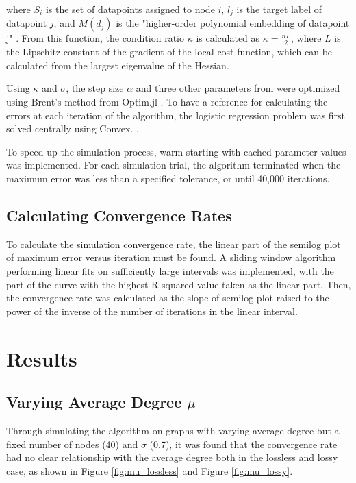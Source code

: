 \documentclass[conference]{IEEEtran}
\begin{document}
where $S_{i}$ is the set of datapoints assigned to node $i$, $l_{j}$ is the target label of datapoint $j$, and $M(d_{j})$ is the "higher-order polynomial embedding of datapoint j" \autocite{ridgleySelfHealingFirstOrderDistributed2021}.
From this function, the condition ratio $\kappa$ is calculated as $\kappa = \frac{nL}{2}$, where $L$ is the Lipschitz constant of the gradient of the local cost function, which can be calculated from the largest eigenvalue of the Hessian.

Using $\kappa$ and $\sigma$, the step size $\alpha$ and three other parameters from \autocite{sundararajanAnalysisDesignFirstOrder2020} were optimized using Brent's method from Optim.jl \autocite{Optim.jl-2018}. To have a reference for calculating the errors 
at each iteration of the algorithm, the logistic regression problem was first solved centrally using Convex. \autocite{Convex.jl-2014}. 

To speed up the simulation process, warm-starting with cached parameter values was implemented. For each simulation trial, the algorithm terminated when the maximum error was less than a specified tolerance, or until 40,000 iterations.

\subsection{Calculating Convergence Rates}

To calculate the simulation convergence rate, the linear part of the semilog plot of maximum error versus iteration must be found. A sliding window algorithm performing linear fits on sufficiently large intervals was implemented, with the 
part of the curve with the highest R-squared value taken as the linear part. Then, the convergence rate was calculated as the slope of semilog plot raised to the power of the inverse of the number of iterations in the linear interval. 

\section{Results}
\label{sec:results}
\subsection{Varying Average Degree $\mu$}
Through simulating the algorithm on graphs with varying average degree but a fixed number of nodes (40) and $\sigma$ (0.7), it was found that the convergence rate had no clear relationship with the average degree both in the lossless and lossy case, as shown in 
Figure \ref{fig:mu_lossless} and Figure \ref{fig:mu_lossy}. 
\end{document}
